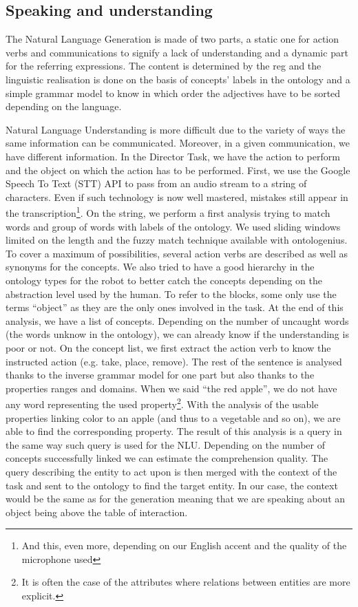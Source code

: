 \subsection{Speaking and understanding}

The Natural Language Generation is made of two parts, a static one for action verbs and communications to signify a lack of understanding and a dynamic part for the referring expressions. The content is determined by the \acrshort{reg} and the linguistic realisation is done on the basis of concepts' labels in the ontology and a simple grammar model to know in which order the adjectives have to be sorted depending on the language.

Natural Language Understanding is more difficult due to the variety of ways the same information can be communicated. Moreover, in a given communication, we have different information. In the Director Task, we have the action to perform and the object on which the action has to be performed. First, we use the Google Speech To Text (STT) API to pass from an audio stream to a string of characters. Even if such technology is now well mastered, mistakes still appear in the transcription\footnote{And this, even more, depending on our English accent and the quality of the microphone used}. On the string, we perform a first analysis trying to match words and group of words with labels of the ontology. We used sliding windows limited on the length and the fuzzy match technique available with ontologenius. To cover a maximum of possibilities, several action verbs are described as well as synonyms for the concepts. We also tried to have a good hierarchy in the ontology types for the robot to better catch the concepts depending on the abstraction level used by the human. To refer to the blocks, some only use the terms ``object'' as they are the only ones involved in the task. At the end of this analysis, we have a list of concepts. Depending on the number of uncaught words (the words unknow in the ontology), we can already know if the understanding is poor or not. On the concept list, we first extract the action verb to know the instructed action (e.g. take, place, remove). The rest of the sentence is analysed thanks to the inverse grammar model for one part but also thanks to the properties ranges and domains. When we said ``the red apple'', we do not have any word representing the used property\footnote{It is often the case of the attributes where relations between entities are more explicit.}. With the analysis of the usable properties linking color to an apple (and thus to a vegetable and so on), we are able to find the corresponding property. The result of this analysis is a \sparql{} query in the same way such query is used for the NLU. Depending on the number of concepts successfully linked we can estimate the comprehension quality. The \sparql{} query describing the entity to act upon is then merged with the context of the task and sent to the ontology to find the target entity. In our case, the context would be the same as for the generation meaning that we are speaking about an object being above the table of interaction.

